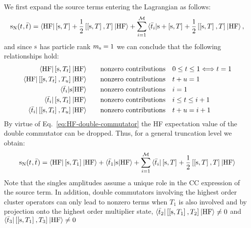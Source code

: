 We first expand the source terms entering the Lagrangian as follows:
\begin{equation}
  \mathrm{s}_{\mathrm{N}}(t_{}, \bar{t}_{}) =
  \braket{\mathrm{HF} | \left[ \mathrm{s}, T \right]^{} + \frac{1}{2}\left[ \left[ \mathrm{s}, T \right]^{}, T \right]^{} | \mathrm{HF}}
  + \sum_{i=1}^{\mathcal{M}}\braket{\bar{t}_{i} | \mathrm{s} + \left[ \mathrm{s}, T \right]^{} +
  \frac{1}{2}\left[ \left[ \mathrm{s}, T \right]^{}, T \right]^{} | \mathrm{HF}},
\end{equation}
and since $\mathrm{s}$ has particle rank $m_{\mathrm{s}} = 1$ we can conclude that the
following relationships hold:
\begin{subequations}
\begin{align}
  \braket{\mathrm{HF} |
  \left[ \mathrm{s}, T_t \right]^{}
  | \mathrm{HF}}
  &\quad\quad\text{nonzero contributions} \quad 0 \leq t \leq 1
  \Longleftrightarrow t = 1 \\
  \braket{\mathrm{HF} |
  \left[ \left[ \mathrm{s}, T_t \right]^{}, T_u \right]^{}
  | \mathrm{HF}}
  &\quad\quad\text{nonzero contributions} \quad t + u = 1
  \label{eq:HF-double-commutator} \\
  \braket{\bar{t}_{i} |
  \mathrm{s}
  | \mathrm{HF} }
  &\quad\quad\text{nonzero contributions} \quad i = 1 \\
  \braket{\bar{t}_{i} |
  \left[ \mathrm{s}, T_t \right]^{}
  | \mathrm{HF} }
  &\quad\quad\text{nonzero contributions} \quad i \leq t \leq i + 1 \\
  \braket{\bar{t}_{i} |
  \left[ \left[ \mathrm{s}, T_t \right]^{}, T_u \right]^{}
  | \mathrm{HF} }
  &\quad\quad\text{nonzero contributions} \quad t + u = i + 1
\end{align}
\end{subequations}
By virtue of Eq.~\eqref{eq:HF-double-commutator} the \acs{HF}
expectation value of the double commutator can be dropped. Thus, for a
general truncation level we obtain:
\begin{equation}\label{eq:source-term}
  \mathrm{s}_{\mathrm{N}}(t_{}, \bar{t}_{}) =
  \braket{\mathrm{HF} | \left[ \mathrm{s}, T_1 \right]^{} | \mathrm{HF}}
  + \braket{\bar{t}_{1} | \mathrm{s} | \mathrm{HF}}
  + \sum_{i=1}^{\mathcal{M}}\braket{\bar{t}_{i} | \left[ \mathrm{s}, T \right]^{} + \frac{1}{2}\left[ \left[ \mathrm{s}, T \right]^{}, T \right]^{} | \mathrm{HF}}
\end{equation}
Note that the singles amplitudes assume a unique role in the \acs{CC}
expression of the source term.
In addition, double commutators involving the highest order cluster
operators can only lead to nonzero terms when $T_1$ is also involved and
by projection onto the highest order multiplier state, \eg
$\braket{\bar{t}_{2} | \left[ \left[ \mathrm{s}, T_1 \right]^{}, T_2 \right]^{} |
\mathrm{HF}} \neq 0$ and $\braket{\bar{t}_{3} |
\left[ \left[ \mathrm{s}, T_1 \right]^{}, T_3 \right]^{} | \mathrm{HF}} \neq 0$
